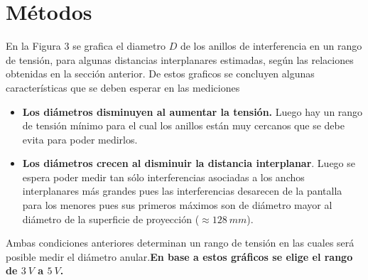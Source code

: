 \documentclass[a4paper, 10pt, spanish]{article}
\numberwithin{equation}{section}
\numberwithin{table}{section}
\begin{document}
\newpage
\section{Métodos}


En la Figura 3 se grafica el diametro $D$ de los anillos de interferencia en un rango de tensión, para algunas distancias interplanares estimadas, según las relaciones obtenidas en la sección anterior. De estos graficos se concluyen algunas características que se deben esperar en las mediciones

\begin{itemize}
  \item \textbf{Los diámetros disminuyen al aumentar la tensión.} Luego hay un rango de tensión mínimo para el cual los anillos están muy cercanos que se debe evita para poder medirlos.
  \item \textbf{Los diámetros crecen al disminuir la distancia interplanar}. Luego se espera poder medir tan sólo interferencias asociadas a los anchos interplanares más grandes pues las interferencias desarecen de la pantalla para los menores pues sus primeros máximos son de diámetro mayor al diámetro de la superficie de proyección ($\approx 128\ mm$).
  \end{itemize}

Ambas condiciones anteriores determinan un rango de tensión en las cuales será posible medir el diámetro anular.\textbf{En base a estos gráficos se elige el rango de $3\ V$ a $5\ V$.}
\end{document}
